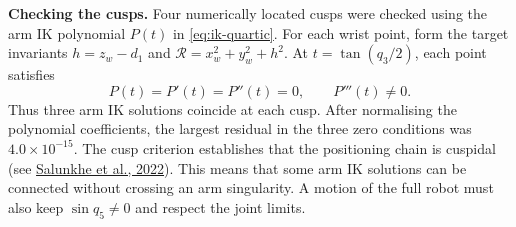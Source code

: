 \textbf{Checking the cusps.}
Four numerically located cusps were checked using the arm IK polynomial
$P(t)$ in \eqref{eq:ik-quartic}. For each wrist point, form the target
invariants $h=z_w-d_1$ and $\mathcal R=x_w^2+y_w^2+h^2$.
At $t=\tan(q_3/2)$, each point satisfies
\begin{equation}
 P(t)=P'(t)=P''(t)=0,\qquad P'''(t)\ne0.
\end{equation}
Thus three arm IK solutions coincide at each cusp.
After normalising the polynomial coefficients, the largest residual
in the three zero conditions was $4.0\times10^{-15}$.
The cusp criterion establishes that the positioning chain is cuspidal
(see \href{https://doi.org/10.1016/j.mechmachtheory.2022.104729}
{Salunkhe et al., 2022}). This means that some arm IK solutions can be
connected without crossing an arm singularity. A motion of the full
robot must also keep $\sin q_5\ne0$ and respect the joint limits.
